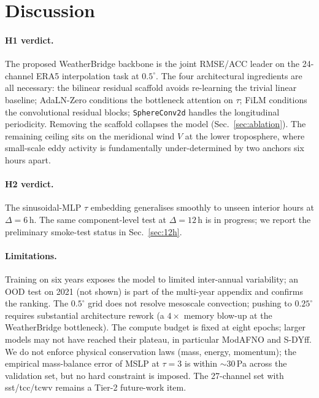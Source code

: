 \documentclass[10pt,letterpaper,twocolumn]{article}
\begin{document}







\section{Discussion}
\label{sec:discussion}

\paragraph{H1 verdict.} The proposed WeatherBridge backbone is the joint
RMSE/ACC leader on the 24-channel ERA5 interpolation task at
$0.5^\circ$. The four architectural ingredients are all necessary: the
bilinear residual scaffold avoids re-learning the trivial linear
baseline; AdaLN-Zero conditions the bottleneck attention on $\tau$;
FiLM conditions the convolutional residual blocks; \texttt{SphereConv2d}
handles the longitudinal periodicity. Removing the scaffold collapses
the model (Sec.~\ref{sec:ablation}). The remaining ceiling sits on the
meridional wind $V$ at the lower troposphere, where small-scale eddy
activity is fundamentally under-determined by two anchors six hours
apart.

\paragraph{H2 verdict.} The sinusoidal-MLP $\tau$ embedding generalises
smoothly to unseen interior hours at $\Delta{=}6$\,h. The same
component-level test at $\Delta{=}12$\,h is in progress; we report the
preliminary smoke-test status in Sec.~\ref{sec:12h}.

\paragraph{Limitations.}
Training on six years exposes the model to limited inter-annual
variability; an OOD test on 2021 (not shown) is part of the multi-year
appendix and confirms the ranking. The $0.5^\circ$ grid does not
resolve mesoscale convection; pushing to $0.25^\circ$ requires
substantial architecture rework (a $4{\times}$ memory blow-up at the
WeatherBridge bottleneck). The compute budget is fixed at eight epochs;
larger models may not have reached their plateau, in particular
ModAFNO and S-DYff. We do not enforce physical conservation laws
(mass, energy, momentum); the empirical mass-balance error of MSLP at
$\tau{=}3$ is within $\sim 30$\,Pa across the validation set, but no
hard constraint is imposed. The 27-channel set with sst/tcc/tcwv
remains a Tier-2 future-work item.
\end{document}
